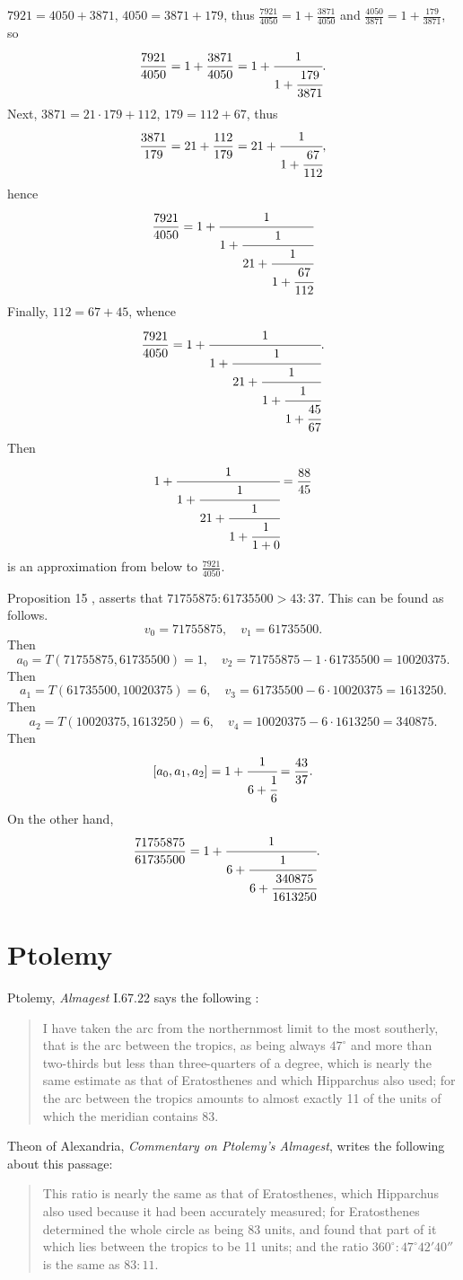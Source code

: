 \documentclass{article}
\begin{document}
$7921=4050+3871$, $4050=3871+179$, thus
$\frac{7921}{4050}=1+\frac{3871}{4050}$ and $\frac{4050}{3871}=1+\frac{179}{3871}$, so
\[
\frac{7921}{4050}=1+\frac{3871}{4050} = 1+\cfrac{1}{1+\cfrac{179}{3871}}.
\] 
Next, 
$3871=21\cdot 179+112$, $179=112+67$, thus
\[
\frac{3871}{179} = 21 +  \frac{112}{179} = 21+\cfrac{1}{1+\cfrac{67}{112}},
\]
hence
\[
\frac{7921}{4050} = 1+\cfrac{1}{1+\cfrac{1}{21+\cfrac{1}{1+\cfrac{67}{112}}}}
\]
Finally, $112=67+45$, whence
\[
\frac{7921}{4050} = 1+\cfrac{1}{1+\cfrac{1}{21+\cfrac{1}{1+\cfrac{1}{1+\cfrac{45}{67}}}}}.
\] 
Then
\[
1+\cfrac{1}{1+\cfrac{1}{21+\cfrac{1}{1+\cfrac{1}{1+0}}}} = \frac{88}{45}
\]
is an approximation from below to $\frac{7921}{4050}$. 

Proposition 15 \cite[p.~407]{aristarchus}, asserts that $71755875:61735500>43:37$. This can be found as follows. 
\[
v_0=71755875,\quad v_1 = 61735500.
\]
Then
\[
a_0 = T(71755875,61735500) = 1,\quad v_2 = 71755875 - 1\cdot 61735500 = 10020375.
\]
Then
\[
a_1 = T(61735500,10020375)=6,\quad v_3 = 61735500 - 6 \cdot 10020375 = 1613250.
\]
Then
\[
a_2 = T(10020375,1613250)=6,\quad v_4 = 10020375- 6 \cdot 1613250 = 340875.
\]
Then
\[
[a_0,a_1,a_2 ] = 1+\cfrac{1}{6+\cfrac{1}{6}} = \frac{43}{37}.
\]
On the other hand,
\begin{align*}
\frac{71755875}{61735500}&=1+\cfrac{1}{6+\cfrac{1}{6+\cfrac{340875}{1613250}}}.
\end{align*}





\section{Ptolemy}
Ptolemy, {\em Almagest} I.67.22 says the following \cite[p.~91, Fragment 41]{dicks}:

\begin{quote}
I have taken the arc from the northernmost limit to the most southerly, that is the arc between the tropics, as being always $47^\circ$ and more than two-thirds
but less than three-quarters of a degree, which is nearly the same estimate as that of Eratosthenes and which Hipparchus also used; for the arc between the tropics
amounts to almost exactly 11 of the units of which the meridian contains 83.
\end{quote}

Theon of Alexandria, {\em Commentary on Ptolemy's Almagest}, writes the following about this passage:

\begin{quote}
This ratio is nearly the same as that of Eratosthenes, which Hipparchus also used because it had been accurately measured; for Eratosthenes determined
the whole circle as being 83 units, and found that part of it which lies between the tropics to be 11 units; and the ratio $360^\circ: 47^\circ 42' 40''$ is the same as $83:11$.
\end{quote}
\end{document}
